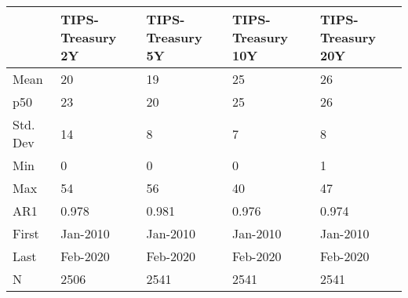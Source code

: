 \begin{tabular}{lllll}
\toprule
 & TIPS-Treasury 2Y & TIPS-Treasury 5Y & TIPS-Treasury 10Y & TIPS-Treasury 20Y \\
\midrule
Mean & 20 & 19 & 25 & 26 \\
p50 & 23 & 20 & 25 & 26 \\
Std. Dev & 14 & 8 & 7 & 8 \\
Min & 0 & 0 & 0 & 1 \\
Max & 54 & 56 & 40 & 47 \\
AR1 & 0.978 & 0.981 & 0.976 & 0.974 \\
First & Jan-2010 & Jan-2010 & Jan-2010 & Jan-2010 \\
Last & Feb-2020 & Feb-2020 & Feb-2020 & Feb-2020 \\
N & 2506 & 2541 & 2541 & 2541 \\
\bottomrule
\end{tabular}
